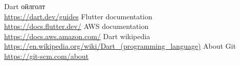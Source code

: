 
\singlespace
{}
\begin{thebibliography}{99}
	Dart ойлголт
	\\\url{https://dart.dev/guides}
	Flutter documentation
	\\\url{https://docs.flutter.dev/}
	AWS documentation
	\\\url{https://docs.aws.amazon.com/}
	Dart wikipedia
	\\\url{ https://en.wikipedia.org/wiki/Dart_(programming_language)}
	About Git
	\\\url{https://git-scm.com/about}
\end{thebibliography}
